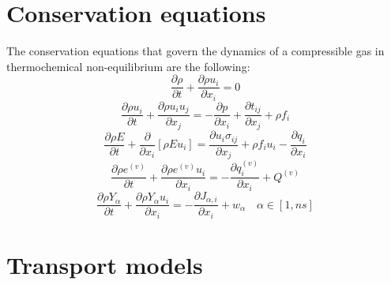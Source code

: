 \documentclass[oneside,a4paper,11pt]{report}
\begin{document}
\section{Conservation equations}
The conservation equations that govern the dynamics of a compressible gas in thermochemical non-equilibrium are the following:
\begin{equation}
\frac{\partial \rho}{\partial t} + \frac{\partial \rho u_i}{\partial x_i} = 0
\end{equation}
\begin{equation}
\frac{\partial \rho u_i}{\partial t} + \frac{\partial \rho u_i u_j}{\partial x_j} = - \frac{\partial p}{\partial x_i} + \frac{\partial t_{ij}}{\partial x_j} + \rho f_i
\end{equation}
\begin{equation}
\frac{\partial \rho E}{\partial t} + \frac{\partial}{\partial x_i} \left [ \rho E u_i \right ] = \frac{\partial u_i \sigma_{ij}}{\partial x_j} + \rho f_i u_i -  \frac{\partial q_i}{\partial x_i}
\end{equation}
\begin{equation}
\frac{\partial \rho e^{(v)}}{\partial t} + \frac{\partial \rho e^{(v)} u_i}{\partial x_i}  = -  \frac{\partial q_i^{(v)}}{\partial x_i} + Q^{(v)}
\end{equation}
\begin{equation}
\frac{\partial\rho Y_\alpha}{\partial t}+\frac{\partial \rho Y_\alpha u_i}{\partial x_i} = -\frac{\partial J_{\alpha,i}}{\partial x_i} + w_\alpha \quad \alpha \in [1,ns]
\end{equation}

\section{Transport models}

\end{document}
